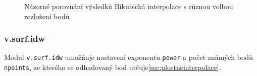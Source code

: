\documentclass[a4paper,12pt,oneside]{report}
\begin{document}
\begin{figure}[h!]%
    \centering
    \qquad
           \caption[Bikubická interpolace]{Názorné porovnání výsledků Bikubická interpolace s různou volbou rozložení bodů \centering}%

    \label{fig:example}%
\end{figure}


\subsubsection*{v.surf.idw}
Modul \texttt{v.surf.idw} umožňuje nastavení exponentu \texttt{power}
a počet známých bodů \texttt{npoints}, ze kterého se odhadovaný bod
určuje\ref{sec:plostneinterpolace}.
\end{document}
